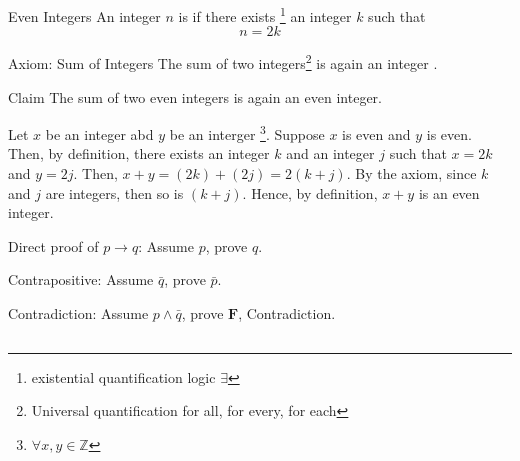 \begin{state}{Even Integers}
    An integer $n$ is  if there exists \footnote{existential quantification logic $\exists$} an integer $k$ such that $$n=2k$$
\end{state}



\begin{state}{Axiom: Sum of Integers}
    The sum of two integers\footnote{Universal quantification for all, for every, for each} is again an integer .
\end{state}


\begin{state}{Claim}
    The sum of two even integers is again an even integer.
\end{state}
\begin{subprove}
    Let $x$ be an integer abd $y$ be an interger \footnote{$\forall x,y \in \mathbb{Z}$}. 
    Suppose $x$ is even and $y$ is even. Then, by definition, there exists an integer 
    $k$ and an integer $j$ such that $x=2k$ and $y=2j$. Then, 
    $x+y=\left(2k\right)+\left(2j\right)=2\left(k+j\right)$. By the axiom, since $k$ and 
    $j$ are integers, then so is $\left(k+j\right)$. Hence, by definition, $x+y$ is an 
    even integer.
\end{subprove}

Direct proof of $p \to q$: Assume $p$, prove $q$.

Contrapositive: Assume $\bar{q}$, prove $\bar{p}$.

Contradiction: Assume $p \wedge \bar{q}$, prove $\boldsymbol{F}$, Contradiction.

\subsection{ }


\subsection{ }
\subsection{ }
\subsection{ }
\subsection{ }


